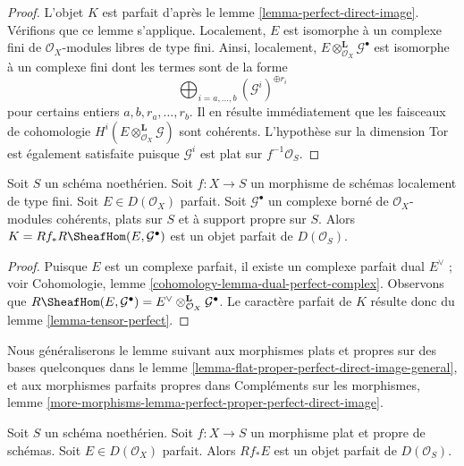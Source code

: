 \begin{proof}
L'objet $K$ est parfait d'après le lemme \ref{lemma-perfect-direct-image}.
Vérifions que ce lemme s'applique. Localement, $E$ est isomorphe à un complexe fini
de $\mathcal{O}_X$-modules libres de type fini. Ainsi, localement,
$E \otimes^\mathbf{L}_{\mathcal{O}_X} \mathcal{G}^\bullet$ est isomorphe
à un complexe fini dont les termes sont de la forme
$$
\bigoplus\nolimits_{i = a, \ldots, b} (\mathcal{G}^i)^{\oplus r_i}
$$
pour certains entiers $a, b, r_a, \ldots, r_b$. Il en résulte immédiatement que les
faisceaux de cohomologie $H^i(E \otimes^\mathbf{L}_{\mathcal{O}_X} \mathcal{G})$
sont cohérents. L'hypothèse sur la dimension Tor est également satisfaite puisque
$\mathcal{G}^i$ est plat sur $f^{-1}\mathcal{O}_S$.
\end{proof}

\begin{lemma}
\label{lemma-ext-perfect}
Soit $S$ un schéma noethérien. Soit $f : X \to S$ un morphisme de schémas
localement de type fini. Soit $E \in D(\mathcal{O}_X)$ parfait.
Soit $\mathcal{G}^\bullet$ un complexe borné de
$\mathcal{O}_X$-modules cohérents, plats sur $S$ et à support propre sur $S$.
Alors $K = Rf_*R\SheafHom(E, \mathcal{G}^\bullet)$ est un objet parfait de
$D(\mathcal{O}_S)$.
\end{lemma}

\begin{proof}
Puisque $E$ est un complexe parfait, il existe un complexe parfait dual
$E^\vee$ ; voir Cohomologie, lemme \ref{cohomology-lemma-dual-perfect-complex}.
Observons que $R\SheafHom(E, \mathcal{G}^\bullet) =
E^\vee \otimes^\mathbf{L}_{\mathcal{O}_X} \mathcal{G}^\bullet$.
Le caractère parfait de $K$ résulte donc du lemme \ref{lemma-tensor-perfect}.
\end{proof}

\noindent
Nous généraliserons le lemme suivant aux morphismes plats et propres
sur des bases quelconques dans le
lemme \ref{lemma-flat-proper-perfect-direct-image-general},
et aux morphismes parfaits propres dans
Compléments sur les morphismes, lemme
\ref{more-morphisms-lemma-perfect-proper-perfect-direct-image}.

\begin{lemma}
\label{lemma-flat-proper-perfect-direct-image}
Soit $S$ un schéma noethérien. Soit $f : X \to S$ un morphisme plat et propre
de schémas. Soit $E \in D(\mathcal{O}_X)$ parfait. Alors
$Rf_*E$ est un objet parfait de $D(\mathcal{O}_S)$.
\end{lemma}

